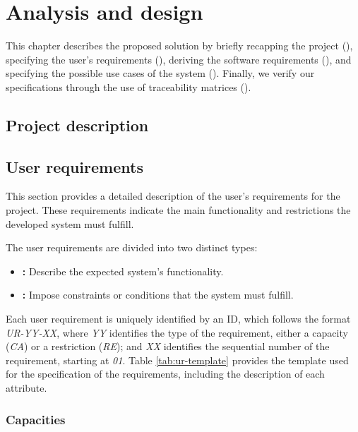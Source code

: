 \chapter{Analysis and design}\label{chap:analysis}
This chapter describes the proposed solution by briefly recapping the project (), specifying the user's requirements (), deriving the software requirements (), and specifying the possible use cases of the system (). Finally, we verify our specifications through the use of traceability matrices ().



\section{Project description}\label{sec:project-description}




\section{User requirements}\label{sec:user-requirements}
This section provides a detailed description of the user's requirements for the project. These requirements indicate the main functionality and restrictions the developed system must fulfill.

The user requirements are divided into two distinct types:
\begin{itemize}[noitemsep]
  \item \textbf{:} Describe the expected system's functionality.
  \item \textbf{:} Impose constraints or conditions that the system must fulfill.
\end{itemize}

Each user requirement is uniquely identified by an ID, which follows the format \textit{UR-YY-XX}, where \textit{YY} identifies the type of the requirement, either a capacity (\textit{CA}) or a restriction (\textit{RE}); and \textit{XX} identifies the sequential number of the requirement, starting at \textit{01}. Table \ref{tab:ur-template} provides the template used for the specification of the requirements, including the description of each attribute.



\subsection{Capacities}\label{subsec:capacities}

